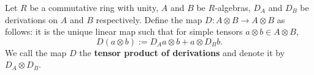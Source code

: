 \begin{definition}
  Let
  {
    $R$ be a commutative ring with unity,
    $A$ and $B$ be $R$-algebras,
    $D_A$ and $D_B$ be derivations on $A$ and $B$ respectively.
  }
  Define the map $D \colon A \otimes B \to A \otimes B$ as follows:
  it is the unique linear map such that for simple tensors
  $a \otimes b \in A \otimes B$,
  \begin{equation}
    D(a \otimes b) := D_A a \otimes b + a \otimes D_B b.
  \end{equation}
  We call the map $D$ the \textbf{tensor product of derivations}
  and denote it by $D_A \otimes D_B$.
\end{definition}
